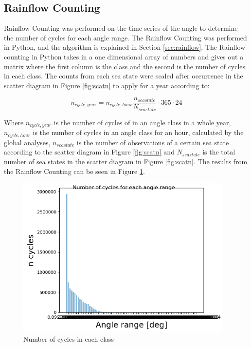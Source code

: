 \subsection{Rainflow Counting}
 Rainflow Counting was performed on the time series of the angle to determine the number of cycles for each angle range. The Rainflow Counting was performed in Python, and the algorithm is explained in Section \ref{sec:rainflow}. The Rainflow counting in Python takes in a one dimensional array of numbers and gives out a matrix where the first column is the class and the second is the number of cycles in each class. The counts from each sea state were scaled after occurrence in the scatter diagram in Figure \ref{fig:scatn} to apply for a year according to:

\begin{equation}
    n_{cycle,year}=n_{cycle,hour} \frac{n_{seastate}}{N_{seastate}} \cdot 365 \cdot 24 
\end{equation}

\noindent Where $n_{cycle,year}$ is the number of cycles of in an angle class in a whole year, $n_{cycle,hour}$ is the number of cycles in an angle class for an hour, calculated by the global analyses, $n_{seastate}$ is the number of observations of a certain sea state according to the scatter diagram in Figure \ref{fig:scatn} and $N_{seastate}$ is the total number of sea states in the scatter diagram in Figure \ref{fig:scatn}.\newline
\newline 
\noindent The results from the Rainflow Counting can be seen in Figure \ref{fig:initialcyc}.  

\begin{figure}[H]
\centering
\includegraphics[scale=0.9]{figures/initialcyc}
\caption[Number of cycles in each class]{Number of cycles in each class}
 \label{fig:initialcyc}
\end{figure}

